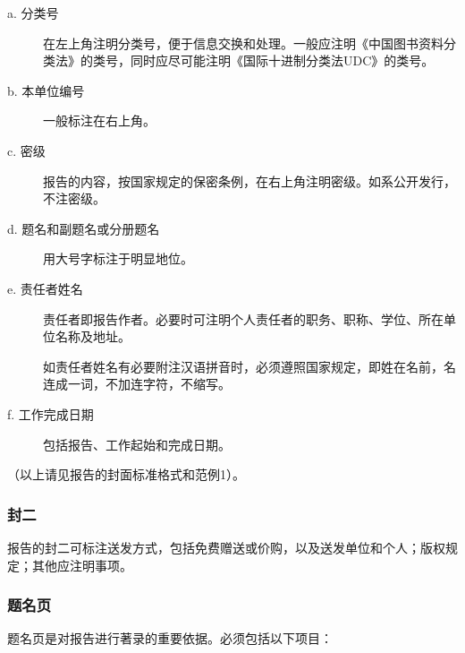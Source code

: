 \begin{description}

\item[a. 分类号]

  在左上角注明分类号，便于信息交换和处理。一般应注明《中国图书资料分类法》的类号，同时应尽可能注明《国际十进制分类法UDC》的类号。

\item[b. 本单位编号]

  一般标注在右上角。

\item[c. 密级]

  报告的内容，按国家规定的保密条例，在右上角注明密级。如系公开发行，不注密级。

\item[d. 题名和副题名或分册题名]

  用大号字标注于明显地位。

\item[e. 责任者姓名]

  责任者即报告作者。必要时可注明个人责任者的职务、职称、学位、所在单位名称及地址。

  如责任者姓名有必要附注汉语拼音时，必须遵照国家规定，即姓在名前，名连成一词，不加连字符，不缩写。

\item[f. 工作完成日期]
  包括报告、工作起始和完成日期。

\end{description}

（以上请见报告的封面标准格式和范例1）。


\subsubsection{封二}

报告的封二可标注送发方式，包括免费赠送或价购，以及送发单位和个人；版权规定；其他应注明事项。


\subsubsection{题名页}

题名页是对报告进行著录的重要依据。必须包括以下项目：


